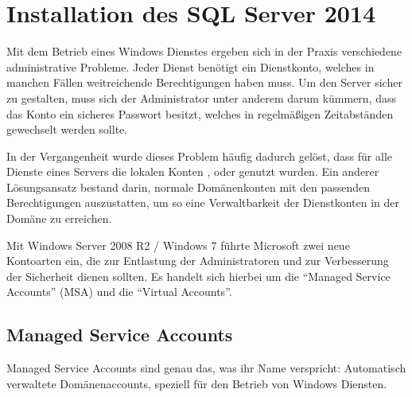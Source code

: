   \chapter{Installation des SQL Server 2014}
  \label{installation_of_sql_server_2014}
    \setcounter{page}{1}
    \minitoc
\newpage
    Mit dem Betrieb eines Windows Dienstes ergeben sich in der Praxis verschiedene
    administrative Probleme. Jeder Dienst benötigt ein Dienstkonto, welches in
    manchen Fällen weitreichende Berechtigungen haben muss. Um den Server sicher
    zu gestalten, muss sich der Administrator unter anderem darum kümmern, dass
    das Konto ein sicheres Passwort besitzt, welches in regelmäßigen Zeitabständen
    gewechselt werden sollte.
    
    In der Vergangenheit wurde dieses Problem häufig dadurch gelöst, dass für alle
    Dienste eines Servers die lokalen Konten ,
     oder  genutzt wurden. Ein
    anderer Lösungsansatz bestand darin, normale Domänenkonten mit den passenden
    Berechtigungen auszustatten, um so eine Verwaltbarkeit der Dienstkonten in der
    Domäne zu erreichen.
    
    Mit Windows Server 2008 R2 / Windows 7 führte Microsoft zwei neue Kontoarten
    ein, die zur Entlastung der Administratoren und zur Verbesserung der
    Sicherheit dienen sollten. Es handelt sich hierbei um die \enquote{Managed
    Service Accounts} (MSA) und die \enquote{Virtual Accounts}.
    \section{Managed Service Accounts}
      Managed Service Accounts sind genau das, was ihr Name verspricht:
      Automatisch verwaltete Domänenaccounts, speziell für den Betrieb von
      Windows Diensten.
